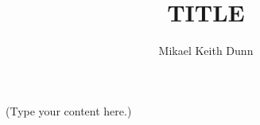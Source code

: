 \documentclass{article}
\begin{document}
\title{TITLE}
\author{Mikael Keith Dunn}
\date{}
\maketitle
(Type your content here.)
\end{document}
